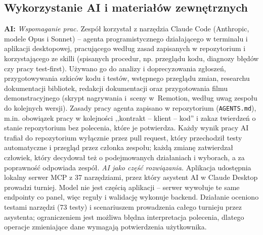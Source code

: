 \documentclass[11pt,a4paper,oneside]{article}
\newif\ifpodpowiedzi
\newcommand{\podpowiedz}[1]{\ifpodpowiedzi\par\begingroup\small\color{hintcolor}\textit{Wskazówka: #1}\par\endgroup\fi}
\begin{document}
\subsection{Wykorzystanie AI i materiałów zewnętrznych}
\podpowiedz{Wskaż narzędzia AI i zakres ich zastosowania w całym projekcie. Rozróżnij wspomaganie prac od mechanizmów AI stanowiących część rozwiązania. Opisz weryfikację uzyskanych wyników; dla funkcji AI w projekcie podaj także sposób oceny działania i ograniczenia. Nie wymaga się pełnej historii rozmów ani wszystkich promptów. Jeśli nie korzystano z AI, wpisz tę informację.}
\textbf{AI:} \emph{Wspomaganie prac.} Zespół korzystał z narzędzia Claude Code (Anthropic, modele Opus i Sonnet) -- agenta programistycznego działającego w terminalu i aplikacji desktopowej, pracującego według zasad zapisanych w repozytorium i korzystającego ze skilli (spisanych procedur, np. przeglądu kodu, diagnozy błędów czy pracy test-first). Używano go do analizy i doprecyzowania zgłoszeń, przygotowywania szkiców kodu i testów, wstępnego przeglądu zmian, researchu dokumentacji bibliotek, redakcji dokumentacji oraz przygotowania filmu demonstracyjnego (skrypt nagrywania i~sceny w~Remotion, według uwag zespołu do kolejnych wersji). Zasady pracy agenta zapisano w repozytorium (\texttt{AGENTS.md}), m.in. obowiązek pracy w kolejności ,,kontrakt -- klient -- kod'' i zakaz twierdzeń o stanie repozytorium bez polecenia, które je potwierdza. Każdy wynik pracy AI trafiał do repozytorium wyłącznie przez pull request, który przechodził testy automatyczne i przegląd przez członka zespołu; każdą zmianę zatwierdzał człowiek, który decydował też o podejmowanych działaniach i wyborach, a za poprawność odpowiada zespół. \emph{AI jako część rozwiązania.} Aplikacja udostępnia lokalny serwer MCP z 37 narzędziami, przez który asystent AI w Claude Desktop prowadzi turniej. Model nie jest częścią aplikacji -- serwer wywołuje te same endpointy co panel, więc reguły i walidację wykonuje backend. Działanie oceniono testami narzędzi (73 testy) i scenariuszem prowadzenia całego turnieju przez asystenta; ograniczeniem jest możliwa błędna interpretacja polecenia, dlatego operacje zmieniające dane wymagają potwierdzenia użytkownika.\par
\podpowiedz{Wskaż wykorzystane biblioteki, modele, dane, zasoby i cudze fragmenty kodu, ich pochodzenie i warunki wykorzystania. Odróżnij je od własnego wkładu. Szczegółowe źródła wymień w wykazie na końcu dokumentu.}
\end{document}
